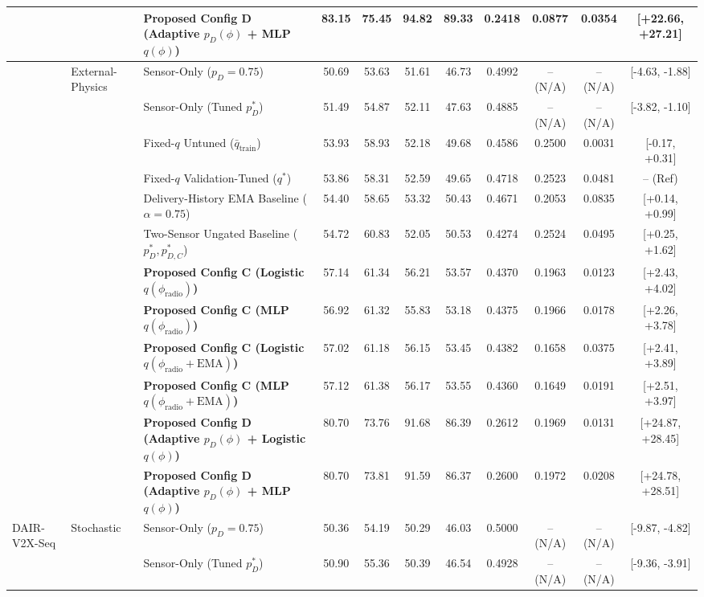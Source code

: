 \begin{table}[!t]
\begin{tabular}{lllcccccccc}
 &  & \textbf{Proposed Config D (Adaptive $p_D(\phi)$ + MLP $q(\phi)$)} & 83.15 & 75.45 & 94.82 & 89.33 & 0.2418 & 0.0877 & 0.0354 & [+22.66, +27.21] \\
\midrule
 & External-Physics & Sensor-Only ($p_D=0.75$) & 50.69 & 53.63 & 51.61 & 46.73 & 0.4992 & -- (N/A) & -- (N/A) & [-4.63, -1.88] \\
 &  & Sensor-Only (Tuned $p_D^*$) & 51.49 & 54.87 & 52.11 & 47.63 & 0.4885 & -- (N/A) & -- (N/A) & [-3.82, -1.10] \\
 &  & Fixed-$q$ Untuned ($\bar{q}_{\text{train}}$) & 53.93 & 58.93 & 52.18 & 49.68 & 0.4586 & 0.2500 & 0.0031 & [-0.17, +0.31] \\
 &  & Fixed-$q$ Validation-Tuned ($q^*$) & 53.86 & 58.31 & 52.59 & 49.65 & 0.4718 & 0.2523 & 0.0481 & -- (Ref) \\
 &  & Delivery-History EMA Baseline ($\alpha=0.75$) & 54.40 & 58.65 & 53.32 & 50.43 & 0.4671 & 0.2053 & 0.0835 & [+0.14, +0.99] \\
 &  & Two-Sensor Ungated Baseline ($p_D^*, p_{D,C}^*$) & 54.72 & 60.83 & 52.05 & 50.53 & 0.4274 & 0.2524 & 0.0495 & [+0.25, +1.62] \\
 &  & \textbf{Proposed Config C (Logistic $q(\phi_{\text{radio}})$)} & 57.14 & 61.34 & 56.21 & 53.57 & 0.4370 & 0.1963 & 0.0123 & [+2.43, +4.02] \\
 &  & \textbf{Proposed Config C (MLP $q(\phi_{\text{radio}})$)} & 56.92 & 61.32 & 55.83 & 53.18 & 0.4375 & 0.1966 & 0.0178 & [+2.26, +3.78] \\
 &  & \textbf{Proposed Config C (Logistic $q(\phi_{\text{radio}}+\text{EMA})$)} & 57.02 & 61.18 & 56.15 & 53.45 & 0.4382 & 0.1658 & 0.0375 & [+2.41, +3.89] \\
 &  & \textbf{Proposed Config C (MLP $q(\phi_{\text{radio}}+\text{EMA})$)} & 57.12 & 61.38 & 56.17 & 53.55 & 0.4360 & 0.1649 & 0.0191 & [+2.51, +3.97] \\
 &  & \textbf{Proposed Config D (Adaptive $p_D(\phi)$ + Logistic $q(\phi)$)} & 80.70 & 73.76 & 91.68 & 86.39 & 0.2612 & 0.1969 & 0.0131 & [+24.87, +28.45] \\
 &  & \textbf{Proposed Config D (Adaptive $p_D(\phi)$ + MLP $q(\phi)$)} & 80.70 & 73.81 & 91.59 & 86.37 & 0.2600 & 0.1972 & 0.0208 & [+24.78, +28.51] \\
\midrule
DAIR-V2X-Seq & Stochastic & Sensor-Only ($p_D=0.75$) & 50.36 & 54.19 & 50.29 & 46.03 & 0.5000 & -- (N/A) & -- (N/A) & [-9.87, -4.82] \\
 &  & Sensor-Only (Tuned $p_D^*$) & 50.90 & 55.36 & 50.39 & 46.54 & 0.4928 & -- (N/A) & -- (N/A) & [-9.36, -3.91] \\

\end{tabular}
\end{table}
